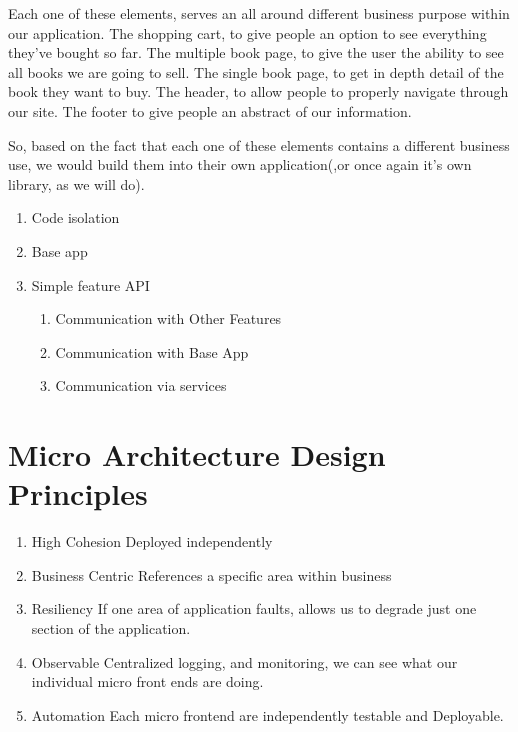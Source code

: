 Each one of these elements, serves an all around different business purpose within our application. The shopping cart, to give people an option to see everything they've bought so far. The multiple book page, to give the user the ability to see all books we are going to sell. The single book page, to get in depth detail of the book they want to buy. The header, to allow people to properly navigate through our site. The footer to give people an abstract of our information. 

So, based on the fact that each one of these elements contains a different business use, we would build them into their own application(,or once again it's own library, as we will do).

\begin{enumerate}
  \item Code isolation
  \item Base app
  \item Simple feature API
  \begin{enumerate}
    \item Communication with Other Features
    \item Communication with Base App
    \item Communication via services
  \end{enumerate}
\end{enumerate}

\section{Micro Architecture Design Principles}
\begin{enumerate}
  \item High Cohesion 
Deployed independently 
  \item Business Centric
References a specific area within business 
  \item Resiliency 
If one area of application faults, allows us to degrade just one section of the application. 
  \item Observable 
Centralized logging, and monitoring, we can see what our individual micro front ends are doing.
  \item Automation 
Each micro frontend are independently testable and Deployable. 
\end{enumerate}

